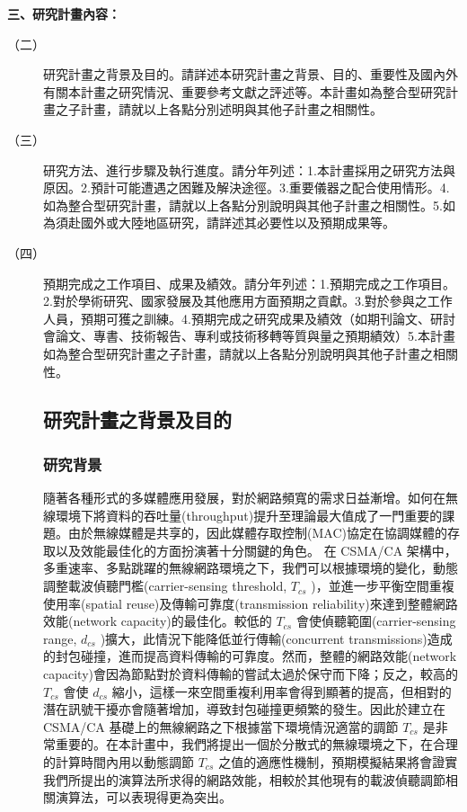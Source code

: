 \documentclass[12pt,a4paper]{article}
\begin{document}
\newtheorem{thm}{Theorem}
\newtheorem{lem}{Lemma}
\newtheorem{cor}{Corollary}
\newtheorem{prop}{Proposition}
\newtheorem{conj}{Conjecture}

\baselineskip 7mm

\noindent
\textbf{\large 三、研究計畫內容：}
\begin{description}
\item[（二）]研究計畫之背景及目的。請詳述本研究計畫之背景、目的、重要性及國內外有關本計畫之研究情況、重要參考文獻之評述等。本計畫如為整合型研究計畫之子計畫，請就以上各點分別述明與其他子計畫之相關性。
\item[（三）]研究方法、進行步驟及執行進度。請分年列述：1.本計畫採用之研究方法與原因。2.預計可能遭遇之困難及解決途徑。3.重要儀器之配合使用情形。4.如為整合型研究計畫，請就以上各點分別說明與其他子計畫之相關性。5.如為須赴國外或大陸地區研究，請詳述其必要性以及預期成果等。
\item[（四）]預期完成之工作項目、成果及績效。請分年列述：1.預期完成之工作項目。2.對於學術研究、國家發展及其他應用方面預期之貢獻。3.對於參與之工作人員，預期可獲之訓練。4.預期完成之研究成果及績效（如期刊論文、研討會論文、專書、技術報告、專利或技術移轉等質與量之預期績效）5.本計畫如為整合型研究計畫之子計畫，請就以上各點分別說明與其他子計畫之相關性。

\setlength\parindent{2em}    %

\setcounter{section}{12}
\setcounter{subsection}{1}

\subsection{研究計畫之背景及目的}
\subsubsection{研究背景}%
隨著各種形式的多媒體應用發展，對於網路頻寬的需求日益漸增。如何在無線環境下將資料的吞吐量(throughput)提升至理論最大值成了一門重要的課題。由於無線媒體是共享的，因此媒體存取控制(MAC)協定在協調媒體的存取以及效能最佳化的方面扮演著十分關鍵的角色。
在 CSMA/CA 架構中，多重速率、多點跳躍的無線網路環境之下，我們可以根據環境的變化，動態調整載波偵聽門檻(carrier-sensing threshold, $T_{cs}$ )，並進一步平衡空間重複使用率(spatial reuse)及傳輸可靠度(transmission reliability)來達到整體網路效能(network capacity)的最佳化。較低的 $T_{cs}$ 會使偵聽範圍(carrier-sensing range, $d_{cs}$ )擴大，此情況下能降低並行傳輸(concurrent transmissions)造成的封包碰撞，進而提高資料傳輸的可靠度。然而，整體的網路效能(network  capacity)會因為節點對於資料傳輸的嘗試太過於保守而下降；反之，較高的 $T_{cs}$ 會使 $d_{cs}$ 縮小，這樣一來空間重複利用率會得到顯著的提高，但相對的潛在訊號干擾亦會隨著增加，導致封包碰撞更頻繁的發生。因此於建立在 CSMA/CA 基礎上的無線網路之下根據當下環境情況適當的調節 $T_{cs}$ 是非常重要的。在本計畫中，我們將提出一個於分散式的無線環境之下，在合理的計算時間內用以動態調節 $T_{cs}$ 之值的適應性機制，預期模擬結果將會證實我們所提出的演算法所求得的網路效能，相較於其他現有的載波偵聽調節相關演算法，可以表現得更為突出。\\




\end{description}
\end{document}
